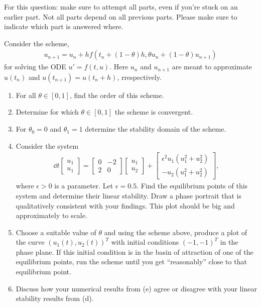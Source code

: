 \documentclass[10pt]{article}
\begin{document}
\begin{problem}
For this question: make sure to attempt all parts, even if you’re stuck on an earlier part. Not all parts depend on all previous parts. Please make sure to indicate which part is answered where.

Consider the scheme,
\begin{align*}
    u_{n+1} = u_n + h f(t_n + (1-\theta) h, \theta u_n + (1-\theta)u_{n+1})
\end{align*}
    for solving the ODE \( u' = f(t,u) \). Here \( u_n \) and \( u_{n+1} \) are meant to approximate \( u(t_n) \) and \( u(t_{n+1}) = u(t_n+h) \), rrespectively.
\begin{enumerate}[nolistsep,label=(\alph*)]
    \item For all \( \theta\in[0,1] \), find the order of this scheme.
    \item Determine for which \( \theta\in[0,1] \) the scheme is convergent.
    \item For \( \theta_0 = 0 \) and \( \theta_1 = 1 \) determine the stability domain of the scheme.
    \item Consider the system
        \begin{align*}
            \dd{}{t} \left[\begin{array}{c}u_1 \\ u_1\end{array}\right]
                = 
            \left[\begin{array}{rr}0 & -2 \\ 2 & 0\end{array}\right]
            \left[\begin{array}{c} u_1 \\ u_2\end{array}\right]
            +
            \left[\begin{array}{rr} \epsilon^2 u_1(u_1^2+u_2^2) \\ -u_2(u_1^2+u_2^2)\end{array}\right],
        \end{align*}
        where \( \epsilon>0 \) is a parameter. Let \( \epsilon=0.5 \). Find the equilibrium points of this system and determine their linear stability. Draw a phase portrait that is qualitatively consistent with your findings. This plot should be big and approximately to scale.
    \item Choose a suitable value of \( \theta \) and using the scheme above, produce a plot of the curve \( (u_1(t), u_2(t))^T \) with initial conditions \( (-1,-1)^T \) in the phase plane. If this initial condition is in the basin of attraction of one of the equilibrium points, run the scheme until you get ``reasonably'' close to that equilibrium point.
    \item Discuss how your numerical results from (e) agree or disagree with your linear stability results from (d).
\end{enumerate}
\end{problem}
\end{document}
